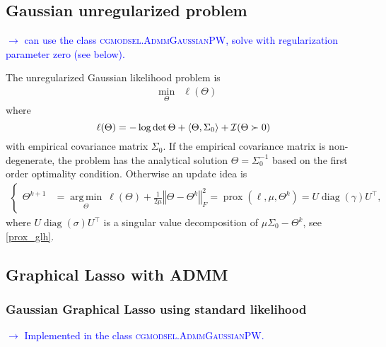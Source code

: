 \documentclass{article}
\newcommand{\loc}[1]{\textcolor{blue}{$\to$ #1}}
\newcommand{\bNorm}[1]{\left\Vert #1\right\Vert} %
\newcommand{\scalp}[1]{ \left\langle #1\right\rangle} %
\DeclareMathOperator{\diag}{diag}
\DeclareMathOperator{\logdet}{log\,det}
\DeclareMathOperator{\argmin}{arg\,min}
\DeclareMathOperator{\prox}{prox}
\begin{document}
% 
\subsection{Gaussian unregularized problem}
\loc{can use the class \textsc{cgmodsel.AdmmGaussianPW}, solve with regularization parameter zero (see below).}

The unregularized Gaussian likelihood problem is 
\begin{equation}
\begin{array}{lrlr}
&\underset{\Theta} {\min}& \ell(\Theta) 
\end{array}
\end{equation}
where
\[\ell(\Theta) = -\logdet \Theta + \scalp{\Theta, \Sigma_0} + \I( \Theta\succ0)\]
with empirical covariance matrix $\Sigma_0$.
If the empirical covariance matrix is non-degenerate, the problem has the analytical solution $\Theta = \Sigma_0^{-1}$ based on the first order optimality condition.
Otherwise an update idea is
\begin{align*}
	\begin{cases}\Theta^{k+1} &= \underset{\Theta}{\argmin} \: \ell(\Theta) + \frac{1}{2\mu}\bNorm{\Theta - \Theta^k}_F^2= \prox(\ell, \mu, \Theta^k) = U \diag(\gamma) U^\top, \end{cases}
\end{align*}
where $U\diag(\sigma) U^\top$ is a singular value decomposition  of $\mu\Sigma_0 - \Theta^k$, see \eqref{prox_glh}.

\subsection{Graphical Lasso with ADMM}

\subsubsection{Gaussian Graphical Lasso using standard likelihood}
\loc{Implemented in the class \textsc{cgmodsel.AdmmGaussianPW}.}
\end{document}
